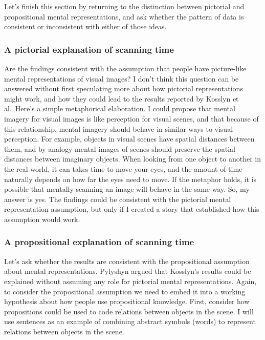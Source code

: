 \documentclass[
  oneside,
  12pt]{crumpbook}
\begin{document}
Let's finish this section by returning to the distinction between pictorial and propositional mental representations, and ask whether the pattern of data is consistent or inconsistent with either of those ideas.

\hypertarget{a-pictorial-explanation-of-scanning-time}{%
\subsubsection{A pictorial explanation of scanning time}\label{a-pictorial-explanation-of-scanning-time}}

Are the findings consistent with the assumption that people have picture-like mental representations of visual images? I don't think this question can be answered without first speculating more about how pictorial representations might work, and how they could lead to the results reported by Kosslyn et al.~Here's a simple metaphorical elaboration. I could propose that mental imagery for visual images is like perception for visual scenes, and that because of this relationship, mental imagery should behave in similar ways to visual perception. For example, objects in visual scenes have spatial distances between them, and by analogy mental images of scenes should preserve the spatial distances between imaginary objects. When looking from one object to another in the real world, it can takes time to move your eyes, and the amount of time naturally depends on how far the eyes need to move. If the metaphor holds, it is possible that mentally scanning an image will behave in the same way. So, my answer is yes. The findings could be consistent with the pictorial mental representation assumption, but only if I created a story that established how this assumption would work.

\hypertarget{a-propositional-explanation-of-scanning-time}{%
\subsubsection{A propositional explanation of scanning time}\label{a-propositional-explanation-of-scanning-time}}

Let's ask whether the results are consistent with the propositional assumption about mental representations. Pylyshyn argued that Kosslyn's results could be explained without assuming any role for pictorial mental representations. Again, to consider the propositional assumption we need to embed it into a working hypothesis about how people use propositional knowledge. First, consider how propositions could be used to code relations between objects in the scene. I will use sentences as an example of combining abstract symbols (words) to represent relations between objects in the scene.
\end{document}
